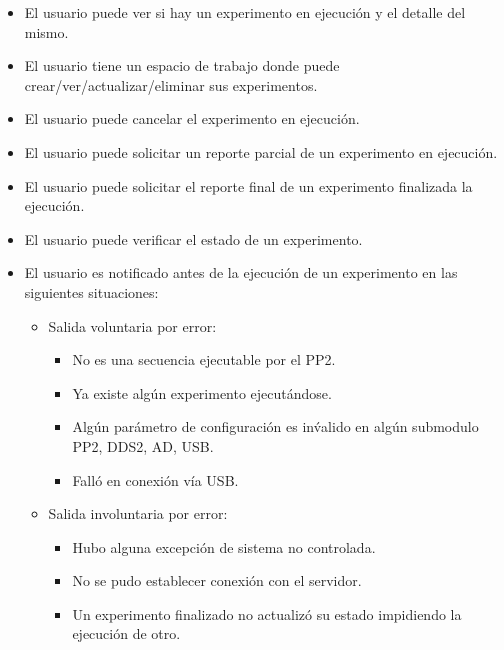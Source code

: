 \begin{itemize}
\item El usuario puede ver si hay un experimento en ejecuci\'on y el detalle del mismo.
\item El usuario tiene un espacio de trabajo donde puede crear/ver/actualizar/eliminar sus experimentos.
\item El usuario puede cancelar el experimento en ejecuci\'on.
\item El usuario puede solicitar un reporte parcial de un experimento en ejecuci\'on.
\item El usuario puede solicitar el reporte final de un experimento finalizada la ejecuci\'on.
\item El usuario puede verificar el estado de un experimento.
\item El usuario es notificado antes de la ejecuci\'on de un experimento en las siguientes situaciones:
    \begin{itemize}
    \item Salida voluntaria por error:
        \begin{itemize}
        \item No es una secuencia ejecutable por el PP2.
        \item Ya existe alg\'un experimento ejecut\'andose.
        \item Alg\'un par\'ametro de configuraci\'on es in\'valido en alg\'un submodulo PP2, DDS2, AD, USB.
        \item Fall\'o en conexi\'on v\'ia USB.
        \end{itemize}
    \end{itemize}    
    \begin{itemize}    
    \item Salida involuntaria por error:
        \begin{itemize}
        \item Hubo alguna excepci\'on de sistema no controlada.
        \item No se pudo establecer conexi\'on con el servidor.
        \item Un experimento finalizado no actualiz\'o su estado impidiendo la ejecuci\'on de otro.
        \end{itemize}
    \end{itemize}
\end{itemize}
